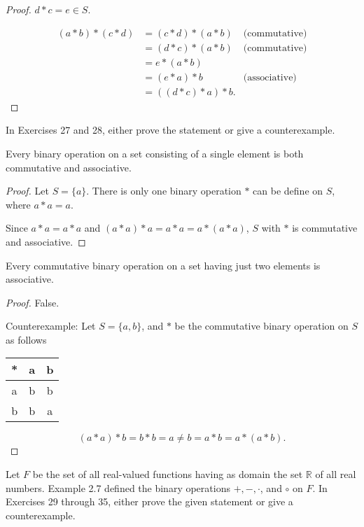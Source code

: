 \begin{proof}
    $d * c = e\in S$.

    \begin{align*}
        (a * b) * (c * d) & = (c * d) * (a * b)  & \text{(commutative)} \\
                          & = (d * c) * (a * b)  & \text{(commutative)} \\
                          & = e * (a * b)                               \\
                          & = (e * a) * b        & \text{(associative)} \\
                          & = ((d * c) * a) * b.
    \end{align*}
\end{proof}

In Exercises 27 and 28, either prove the statement or give a counterexample.

\begin{exercise}
    Every binary operation on a set consisting of a single element is both commutative and associative.
\end{exercise}

\begin{proof}
    Let $S = \{ a \}$. There is only one binary operation $*$ can be define on $S$, where $a * a = a$.

    Since $a * a = a * a$ and $(a * a) * a = a * a = a * (a * a)$, $S$ with $*$ is commutative and associative.
\end{proof}

\begin{exercise}
    Every commutative binary operation on a set having just two elements is associative.
\end{exercise}

\begin{proof}
    False.

    Counterexample: Let $S = \{ a, b \}$, and $*$ be the commutative binary operation on $S$ as follows
    \begin{tabular}{c|cc}
        * & a & b \\
        \midrule
        a & b & b \\
        b & b & a
    \end{tabular}

    \[
        (a * a) * b = b * b = a \ne b = a * b = a * (a * b).
    \]
\end{proof}

Let $F$ be the set of all real-valued functions having as domain the set $\mathbb{R}$ of all real numbers. Example 2.7 defined the binary operations $+, -, \cdot$, and $\circ$ on $F$. In Exercises 29 through 35, either prove the given statement or give a
counterexample.

